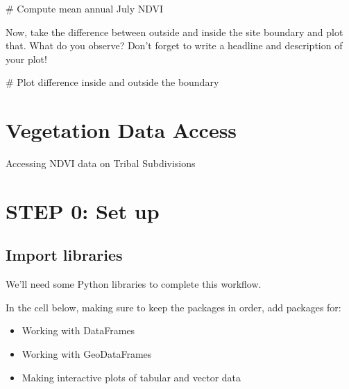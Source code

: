 \documentclass[
  letterpaper,
  DIV=11,
  numbers=noendperiod,
  oneside]{scrreprt}
\newenvironment{Shaded}{\begin{snugshade}}{\end{snugshade}}
\newcommand{\CommentTok}[1]{\textcolor[rgb]{0.37,0.37,0.37}{#1}}
\providecommand{\tightlist}{%
  \setlength{\itemsep}{0pt}\setlength{\parskip}{0pt}}
\begin{document}
\begin{Shaded}
\begin{Highlighting}[]
\CommentTok{\# Compute mean annual July NDVI}
\end{Highlighting}
\end{Shaded}

Now, take the difference between outside and inside the site boundary
and plot that. What do you observe? Don't forget to write a headline and
description of your plot!

\begin{Shaded}
\begin{Highlighting}[]
\CommentTok{\# Plot difference inside and outside the boundary}
\end{Highlighting}
\end{Shaded}


\chapter{Vegetation Data Access}\label{vegetation-data-access}

Accessing NDVI data on Tribal Subdivisions

\hfill\break


\chapter{STEP 0: Set up}\label{step-0-set-up-1}

\section{Import libraries}\label{import-libraries-1}

We'll need some Python libraries to complete this workflow.

\begin{tcolorbox}[enhanced jigsaw, colbacktitle=quarto-callout-color!10!white, opacityback=0, bottomtitle=1mm, toptitle=1mm, bottomrule=.15mm, left=2mm, colframe=quarto-callout-color-frame, leftrule=.75mm, opacitybacktitle=0.6, colback=white, rightrule=.15mm, toprule=.15mm, breakable, titlerule=0mm, title=\textcolor{quarto-callout-color}{\faInfo}\hspace{0.5em}{Try It: Import necessary libraries}, coltitle=black, arc=.35mm]

In the cell below, making sure to keep the packages in order, add
packages for:

\begin{itemize}
\tightlist
\item
  Working with DataFrames
\item
  Working with GeoDataFrames
\item
  Making interactive plots of tabular and vector data
\end{itemize}

\end{tcolorbox}
\end{document}
